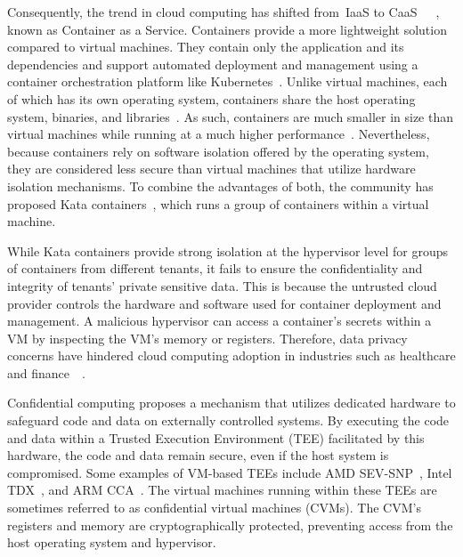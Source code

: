 Consequently, the trend in cloud computing has shifted from~\acrshort{IaaS} to CaaS~\cite*{Azure_container}~\cite*{Amazon_container}~\cite*{google_container}, known as Container as a Service. Containers provide a more lightweight solution compared to virtual machines. They contain only the application and its dependencies and support automated deployment and management using a 
container orchestration platform like Kubernetes~\cite*{k8s}. Unlike virtual machines, each of which has its own operating system, containers share the host operating system, binaries, and libraries~\cite*{container_vs_vm}. As such, containers are much smaller in size than virtual machines 
while running at a much higher performance~\cite*{Shirinbab2020PerformanceEO}. Nevertheless, because containers rely on software isolation offered by the operating system, they are considered less secure than virtual machines that utilize hardware isolation mechanisms. To combine the advantages of both, the community has proposed Kata containers~\cite*{Kata-Containers}, which 
runs a group of containers within a virtual machine.
 
While Kata containers provide strong isolation at the hypervisor level for groups of containers from different tenants, it fails to ensure the confidentiality and integrity of tenants' private sensitive data. This is because the untrusted cloud provider controls the hardware and software used for 
container deployment and management. A malicious hypervisor can access a container's secrets within a VM by inspecting the VM's memory or registers. Therefore, data privacy concerns have hindered cloud computing adoption in industries such as healthcare 
and finance~\cite*{data_privacy}~\cite*{eu_data_Privacy}.
 
Confidential computing proposes a mechanism that utilizes dedicated hardware to safeguard code and data on externally controlled systems. By executing the code and data within a Trusted Execution Environment (TEE) facilitated by this hardware, the code and data remain secure, even if the host system is compromised. Some examples of VM-based \acrshort{TEE}s include 
AMD SEV-SNP~\cite*{SEV_SNP_white_book}, Intel TDX~\cite*{Intel_tdx_whitepaper}, and ARM CCA~\cite*{280904}. The virtual machines running within these \acrshort{TEE}s are sometimes referred to as confidential virtual machines (CVMs). The \acrshort{CVM}'s registers and memory are 
cryptographically protected, preventing access from the host operating system and hypervisor.
 
 
 
